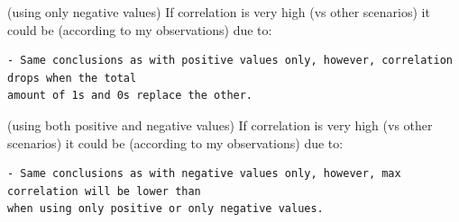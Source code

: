 \documentclass[]{article}
\begin{document}
(using only negative values) If correlation is very high (vs other
scenarios) it could be (according to my observations) due to:

\begin{verbatim}
- Same conclusions as with positive values only, however, correlation drops when the total 
amount of 1s and 0s replace the other.
\end{verbatim}

(using both positive and negative values) If correlation is very high
(vs other scenarios) it could be (according to my observations) due to:

\begin{verbatim}
- Same conclusions as with negative values only, however, max correlation will be lower than 
when using only positive or only negative values.
\end{verbatim}
\end{document}
